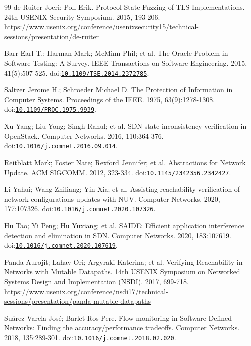 \begin{thebibliography}{99}
de Ruiter Joeri; Poll Erik. Protocol State Fuzzing of TLS Implementations. 24th USENIX Security Symposium. 2015, 193-206. \url{https://www.usenix.org/conference/usenixsecurity15/technical-sessions/presentation/de-ruiter}

Barr Earl T.; Harman Mark; McMinn Phil; et al. The Oracle Problem in Software Testing: A Survey. IEEE Transactions on Software Engineering. 2015, 41(5):507-525. doi:\href{https://doi.org/10.1109/TSE.2014.2372785}{\nolinkurl{10.1109/TSE.2014.2372785}}.

Saltzer Jerome H.; Schroeder Michael D. The Protection of Information in Computer Systems. Proceedings of the IEEE. 1975, 63(9):1278-1308. doi:\href{https://doi.org/10.1109/PROC.1975.9939}{\nolinkurl{10.1109/PROC.1975.9939}}.

Xu Yang; Liu Yong; Singh Rahul; et al. SDN state inconsistency verification in OpenStack. Computer Networks. 2016, 110:364-376. doi:\href{https://doi.org/10.1016/j.comnet.2016.09.014}{\nolinkurl{10.1016/j.comnet.2016.09.014}}.

Reitblatt Mark; Foster Nate; Rexford Jennifer; et al. Abstractions for Network Update. ACM SIGCOMM. 2012, 323-334. doi:\href{https://doi.org/10.1145/2342356.2342427}{\nolinkurl{10.1145/2342356.2342427}}.

Li Yahui; Wang Zhiliang; Yin Xia; et al. Assisting reachability verification of network configurations updates with NUV. Computer Networks. 2020, 177:107326. doi:\href{https://doi.org/10.1016/j.comnet.2020.107326}{\nolinkurl{10.1016/j.comnet.2020.107326}}.

Hu Tao; Yi Peng; Hu Yuxiang; et al. SAIDE: Efficient application interference detection and elimination in SDN. Computer Networks. 2020, 183:107619. doi:\href{https://doi.org/10.1016/j.comnet.2020.107619}{\nolinkurl{10.1016/j.comnet.2020.107619}}.

Panda Aurojit; Lahav Ori; Argyraki Katerina; et al. Verifying Reachability in Networks with Mutable Datapaths. 14th USENIX Symposium on Networked Systems Design and Implementation (NSDI). 2017, 699-718. \url{https://www.usenix.org/conference/nsdi17/technical-sessions/presentation/panda-mutable-datapaths}

Suárez-Varela José; Barlet-Ros Pere. Flow monitoring in Software-Defined Networks: Finding the accuracy/performance tradeoffs. Computer Networks. 2018, 135:289-301. doi:\href{https://doi.org/10.1016/j.comnet.2018.02.020}{\nolinkurl{10.1016/j.comnet.2018.02.020}}.


\end{thebibliography}
